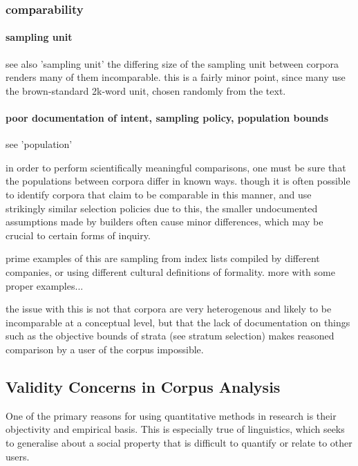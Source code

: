 \subsubsection{comparability}

\paragraph{sampling unit}
see also 'sampling unit'
the differing size of the sampling unit between corpora renders many of them incomparable.  this is a fairly minor point, since many use the brown-standard 2k-word unit, chosen randomly from the text.

\paragraph{poor documentation of intent, sampling policy, population bounds}
see 'population'

in order to perform scientifically meaningful comparisons, one must be sure that the populations between corpora differ in known ways.  though it is often possible to identify corpora that claim to be comparable in this manner, and use strikingly similar selection policies due to this, the smaller undocumented assumptions made by builders often cause minor differences, which may be crucial to certain forms of inquiry.

prime examples of this are sampling from index lists compiled by different companies, or using different cultural definitions of formality.  more with some proper examples...

the issue with this is not that corpora are very heterogenous and likely to be incomparable at a conceptual level, but that the lack of documentation on things such as the objective bounds of strata (see stratum selection) makes reasoned comparison by a user of the corpus impossible.















\subsection{Validity Concerns in Corpus Analysis}
One of the primary reasons for using quantitative methods in research is their objectivity and empirical basis.  This is especially true of linguistics, which seeks to generalise about a social property that is difficult to quantify or relate to other users.

